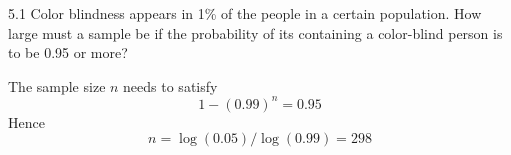 \documentclass[12pt]{article}
\begin{document}
5.1
Color blindness appears in 1\% of the people in a certain
population.
How large must a sample be if the probability of its containing a
color-blind person is to be 0.95 or more?

\bigskip
\noindent
The sample size $n$ needs to satisfy
$$1-(0.99)^n=0.95$$
Hence
$$n=\log(0.05)/\log(0.99)=298$$
\end{document}
